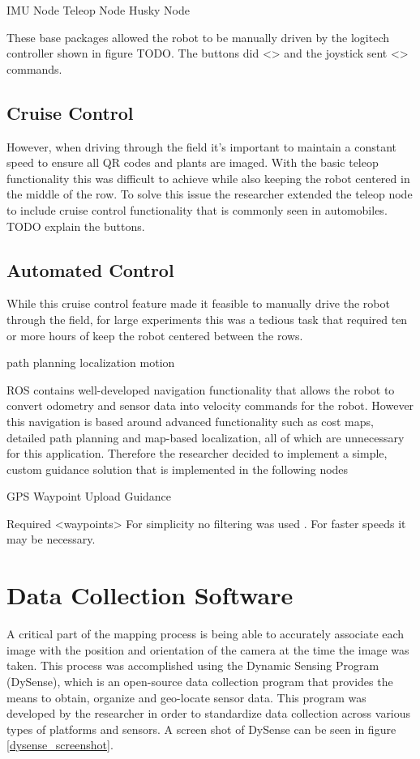 IMU Node
Teleop Node
Husky Node

These base packages allowed the robot to be manually driven by the logitech controller shown in figure TODO.  The buttons did <> and the joystick sent <> commands.  

\subsection{Cruise Control}

However, when driving through the field it's important to maintain a constant speed to ensure all QR codes and plants are imaged.  With the basic teleop functionality this was difficult to achieve while also keeping the robot centered in the middle of the row. To solve this issue the researcher extended the teleop node to include cruise control functionality that is commonly seen in automobiles.  TODO explain the buttons.  

\subsection{Automated Control}
\label{section:automated_control}

While this cruise control feature made it feasible to manually drive the robot through the field, for large experiments this was a tedious task that required ten or more hours of keep the robot centered between the rows.  

path planning
localization
motion

ROS contains well-developed navigation functionality that allows the robot to convert odometry and sensor data into velocity commands for the robot.  However this navigation is based around advanced functionality such as cost maps, detailed path planning and map-based localization, all of which are unnecessary for this application.  Therefore the researcher decided to implement a simple, custom guidance solution that is implemented in the following nodes

GPS
Waypoint Upload
Guidance

Required <waypoints>
For simplicity no filtering was used . For faster speeds it may be necessary.

\section{Data Collection Software}
\label{system-software}

A critical part of the mapping process is being able to accurately associate each image with the position and orientation of the camera at the time the image was taken.  This process was accomplished using the Dynamic Sensing Program (DySense), which is an open-source data collection program that provides the means to obtain, organize and geo-locate sensor data.  This program was developed by the researcher in order to standardize data collection across various types of platforms and sensors.  A screen shot of DySense can be seen in figure \ref{dysense_screenshot}.

